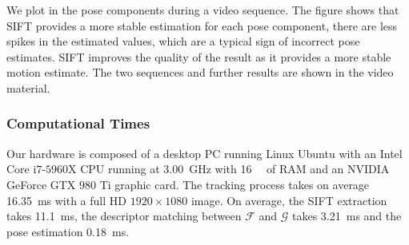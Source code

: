 We plot in  the pose components during a video sequence. The figure shows that SIFT provides a more stable estimation for each pose component, \ie there are less spikes in the estimated values, which are a typical sign of incorrect pose estimates. SIFT improves the quality of the result as it provides a more stable motion estimate. 
The two sequences and further results are shown in the video material. 

\subsubsection{Computational Times}
Our hardware is composed of a desktop PC running Linux Ubuntu with an Intel Core i$7$-$5960$X CPU running at \SI{3.00}{\giga\hertz} with \SI{16}{\giga\byte} of RAM and an NVIDIA GeForce GTX $980$ Ti graphic card.
The tracking process takes on average \SI{16.35}{\milli\second} with a full HD $1920\times1080$ image.
On average, the SIFT extraction takes \SI{11.1}{\milli\second}, the descriptor matching between $\mathcal{F}$ and $\mathcal{G}$ takes \SI{3.21}{\milli\second}  and the pose estimation \SI{0.18}{\milli\second}.



